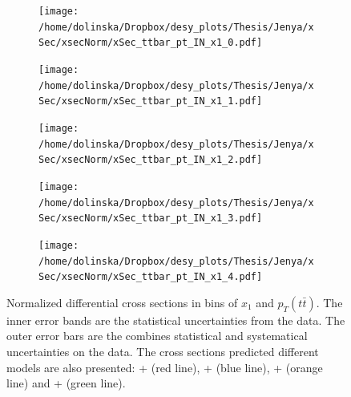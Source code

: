 \begin{figure}
\centering
\begin{subfigure}
  \centering
  \texttt{[image: /home/dolinska/Dropbox/desy\_plots/Thesis/Jenya/xSec/xsecNorm/xSec\_ttbar\_pt\_IN\_x1\_0.pdf]}
\end{subfigure}
\begin{subfigure}
  \centering
  \texttt{[image: /home/dolinska/Dropbox/desy\_plots/Thesis/Jenya/xSec/xsecNorm/xSec\_ttbar\_pt\_IN\_x1\_1.pdf]}
\end{subfigure}
\begin{subfigure}
  \centering
  \texttt{[image: /home/dolinska/Dropbox/desy\_plots/Thesis/Jenya/xSec/xsecNorm/xSec\_ttbar\_pt\_IN\_x1\_2.pdf]}
\end{subfigure}
\begin{subfigure}
  \centering
  \texttt{[image: /home/dolinska/Dropbox/desy\_plots/Thesis/Jenya/xSec/xsecNorm/xSec\_ttbar\_pt\_IN\_x1\_3.pdf]}
\end{subfigure}
\begin{subfigure}
  \centering
  \texttt{[image: /home/dolinska/Dropbox/desy\_plots/Thesis/Jenya/xSec/xsecNorm/xSec\_ttbar\_pt\_IN\_x1\_4.pdf]}
\end{subfigure}
\caption{Normalized differential cross sections in bins of  $x_{1}$ and $p_{T}(t\bar{t})$. The inner error bands are the statistical uncertainties from the data.
         The outer error bars are the combines statistical and systematical uncertainties on the data. The cross sections predicted different models are also presented:
         \MG + \PYTHIA (red line), \Powheg + \PYTHIA (blue line), \Powheg + \HERWIG (orange line) and \MCNLO + \HERWIG (green line).}
\label{fig:XS_2D_x1_pttt}
\end{figure}
